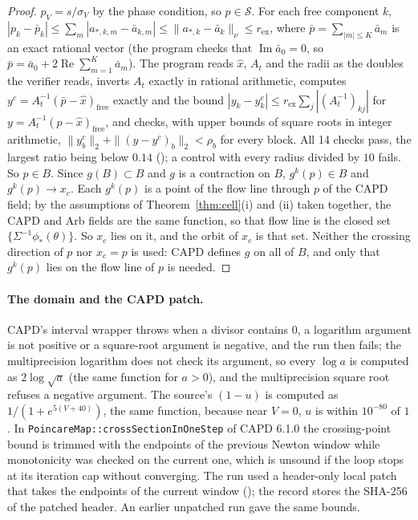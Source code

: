 \documentclass[11pt]{article}
\theoremstyle{definition}
\newcommand{\re}{\operatorname{Re}}
\begin{document}
\begin{proof}
$p_V = s/\sigma_V$ by the phase condition, so $p \in \mathcal S$. For each free component $k$, $|p_k - \bar p_k| \le \sum_m|a_{*,k,m} - \bar a_{k,m}| \le \|a_{*,k} - \bar a_k\|_\nu \le r_{\mathrm{ex}}$, where $\bar p = \sum_{|m|\le K}\bar a_m$ is an exact rational vector (the program checks that $\operatorname{Im}\bar a_0 = 0$, so $\bar p = \bar a_0 + 2\re\sum_{m=1}^K\bar a_m$). The program  reads $\hat x$, $A_t$ and the radii as the doubles the verifier reads, inverts $A_t$ exactly in rational arithmetic, computes $y^c = A_t^{-1}(\bar p - \hat x)_{\mathrm{free}}$ exactly and the bound $|y_k - y^c_k| \le r_{\mathrm{ex}}\sum_j|(A_t^{-1})_{kj}|$ for $y = A_t^{-1}(p - \hat x)_{\mathrm{free}}$, and checks, with upper bounds of square roots in integer arithmetic, $\|y^c_b\|_2 + \|(y - y^c)_b\|_2 < \rho_b$ for every block. All 14 checks pass, the largest ratio being below $0.14$ (); a control with every radius divided by $10$ fails. So $p \in B$. Since $g(B) \subset B$ and $g$ is a contraction on $B$, $g^k(p) \in B$ and $g^k(p) \to x_c$. Each $g^k(p)$ is a point of the flow line through $p$ of the CAPD field; by the assumptions of Theorem~\ref{thm:cell}(i) and (ii) taken together, the CAPD and Arb fields are the same function, so that flow line is the closed set $\{\Sigma^{-1}\phi_*(\theta)\}$. So $x_c$ lies on it, and the orbit of $x_c$ is that set. Neither the crossing direction of $p$ nor $x_c = p$ is used: CAPD defines $g$ on all of $B$, and only that $g^k(p)$ lies on the flow line of $p$ is needed.
\end{proof}

\paragraph{The domain and the CAPD patch.} CAPD's interval wrapper throws when a divisor contains $0$, a logarithm argument is not positive or a square-root argument is negative, and the run then fails; the multiprecision logarithm does not check its argument, so every $\log a$ is computed as $2\log\sqrt a$ (the same function for $a > 0$), and the multiprecision square root refuses a negative argument. The source's $(1 - u)$ is computed as $1/(1 + e^{5(V+40)})$, the same function, because near $V = 0$, $u$ is within $10^{-80}$ of $1$. In \texttt{PoincareMap::crossSectionInOneStep} of CAPD 6.1.0 the crossing-point bound is trimmed with the endpoints of the previous Newton window while monotonicity was checked on the current one, which is unsound if the loop stops at its iteration cap without converging. The run used a header-only local patch that takes the endpoints of the current window (); the record stores the SHA-256 of the patched header. An earlier unpatched run gave the same bounds.
\end{document}
